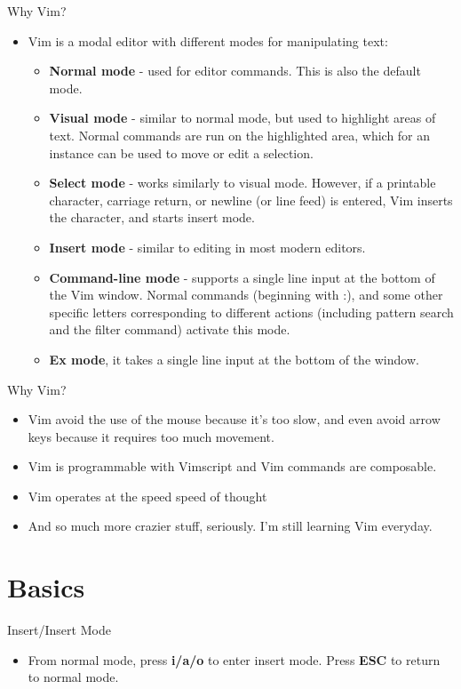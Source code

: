 \documentclass[10pt]{beamer}
\begin{document}
\begin{frame}{Why Vim?}
  \begin{itemize}
    \item<1-> Vim is a modal editor with different modes for manipulating text:
    \begin{itemize}
      \item \textbf{Normal mode} - used for editor commands. This is also the default mode.
      \item \textbf{Visual mode} - similar to normal mode, but used to highlight areas of text. Normal commands are run on the highlighted area, which for an instance can be used to move or edit a selection.
      \item \textbf{Select mode} - works similarly to visual mode. However, if a printable character, carriage return, or newline (or line feed) is entered, Vim inserts the character, and starts insert mode.
      \item \textbf{Insert mode} - similar to editing in most modern editors.
      \item  \textbf{Command-line mode} - supports a single line input at the bottom of the Vim window. Normal commands (beginning with :), and some other specific letters corresponding to different actions (including pattern search and the filter command) activate this mode.
      \item \textbf{Ex mode}, it takes a single line input at the bottom of the window.
    \end{itemize}
  \end{itemize}
\end{frame}

\begin{frame}{Why Vim?}
  \begin{itemize}
    \item<1->Vim avoid the use of the mouse because it's too slow, and even avoid arrow keys because it requires too much movement.
    \item<2->Vim is programmable with Vimscript and Vim commands are composable.
    \item<3->Vim operates at the speed speed of thought
    \item<4->And so much more crazier stuff, seriously. I'm still learning Vim everyday.
  \end{itemize}
\end{frame}

\section{Basics}
\begin{frame}{Insert/Insert Mode}
  \begin{itemize}
    \item From normal mode, press \textbf{i/a/o} to enter insert mode. Press \textbf{ESC} to return to normal mode.
  \end{itemize}
\end{frame}
\end{document}
